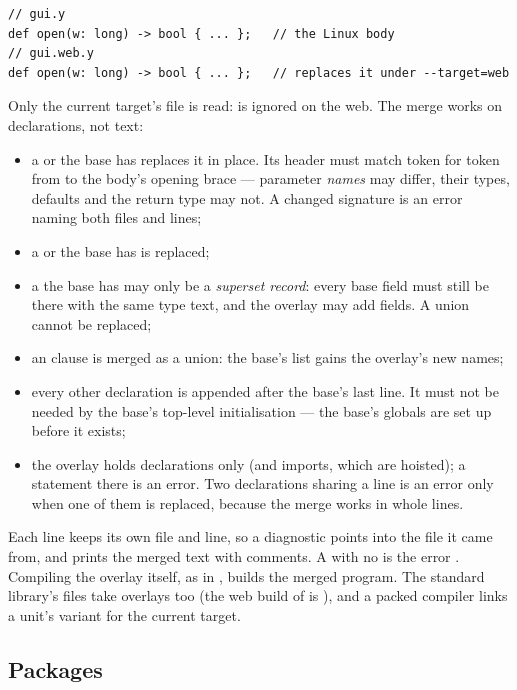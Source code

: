 \begin{lstlisting}
// gui.y
def open(w: long) -> bool { ... };   // the Linux body
// gui.web.y
def open(w: long) -> bool { ... };   // replaces it under --target=web
\end{lstlisting}

\noindent Only the current target's file is read:  is
ignored on the web. The merge works on declarations, not text:

\begin{itemize}
\item a  or  the base has replaces it in place. Its header
  must match token for token from  to the body's opening brace ---
  parameter \emph{names} may differ, their types, defaults and the return
  type may not. A changed signature is an error naming both files and lines;
\item a  or  the base has is replaced;
\item a  the base has may only be a \emph{superset record}: every
  base field must still be there with the same type text, and the overlay may
  add fields. A union cannot be replaced;
\item an  clause is merged as a union: the base's list gains the
  overlay's new names;
\item every other declaration is appended after the base's last line. It must
  not be needed by the base's top-level initialisation --- the base's globals
  are set up before it exists;
\item the overlay holds declarations only (and imports, which are hoisted);
  a statement there is an error. Two declarations sharing a line is an error
  only when one of them is replaced, because the merge works in whole lines.
\end{itemize}

\noindent Each line keeps its own file and line, so a diagnostic points into
the file it came from, and  prints the merged text with
 comments. A  with no  is the
error . Compiling the overlay
itself, as in , builds the merged program.
The standard library's files take overlays too (the web build of  is
), and a packed compiler links a unit's variant for the current
target.

\subsection{Packages}

